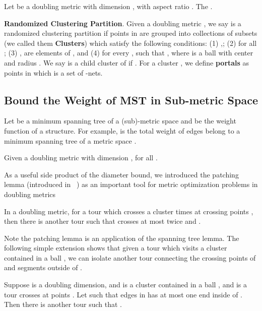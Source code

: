 \documentclass{llncs}
\begin{document}
\begin{lemma}
Let  be a doubling metric with dimension ,  with aspect ratio .
The .
\end{lemma}

\noindent\textbf{Randomized Clustering Partition}. Given a doubling metric , we say  is a randomized clustering partition if points in  are grouped into collections of subsets  (we called them \textbf{Clusters}) which satisfy the following conditions: (1) ,; (2)  for all ; (3) ,  are elements of , and (4) for every ,  such that , where  is a ball with center  and radius .
We say  is a child cluster of  if .
For a cluster , we define \textbf{portals} as points in  which is a set of -nets.



\subsection{Bound the Weight of MST in Sub-metric Space}

Let  be a minimum spanning tree of a (sub)-metric space and  be the weight function of a structure.
For example,  is the total weight of edges belong to a minimum spanning tree of a metric space .

\begin{lemma}
Given a doubling metric  with dimension ,  for all .
\end{lemma}

As a useful side product of the diameter bound, we introduced the patching lemma 
(introduced in ~\cite{Arora98}) as an important tool for metric optimization problems in doubling metrics~\cite{Talwar04} 

\begin{corollary}
In a doubling metric, for a tour  which crosses a cluster   times at crossing points , then there is another tour  such that  crosses  at most twice and .
\end{corollary}

Note the patching lemma is an application of the spanning tree lemma. 
The following simple extension shows that given a tour  which visits a cluster  contained in a ball , we can isolate another tour connecting the crossing points of  and segments outside of .

\begin{corollary}
Suppose  is a doubling dimension, and  is a cluster contained in a ball , and  is a tour crosses  at points .
Let  such that edges in  has at most one end inside of .
Then there is another tour  such that .
\end{corollary}
\end{document}
